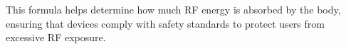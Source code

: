 This formula helps determine how much RF energy is absorbed by the body, ensuring that devices comply with safety standards to protect users from excessive RF exposure.

